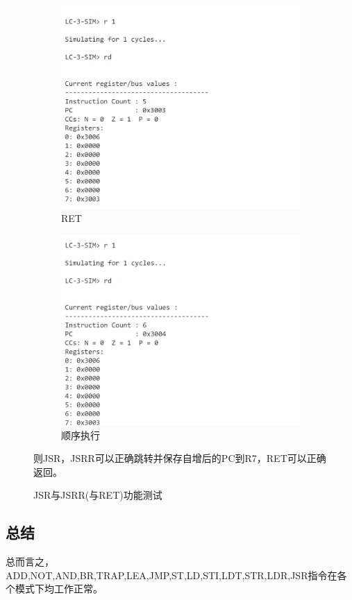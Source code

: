 \documentclass[UTF8]{ctexart}
\begin{document}
\begin{figure}[htbp]
  \begin{subfigure}{0.45\textwidth}
    \includegraphics[width=\linewidth]{jsr5.png}
    \caption{RET}
  \end{subfigure}
  \hfill
  \begin{subfigure}{0.45\textwidth}
    \includegraphics[width=\linewidth]{jsr6.png}
    \caption{顺序执行}
  \end{subfigure}

  \caption{JSR与JSRR(与RET)功能测试}
  \label{jsr}
  则JSR，JSRR可以正确跳转并保存自增后的PC到R7，RET可以正确返回。
\end{figure}

\subsection{总结}
总而言之，ADD,NOT,AND,BR,TRAP,LEA,JMP,ST,LD,STI,LDT,STR,LDR,JSR指令在各个模式下均工作正常。
\end{document}
